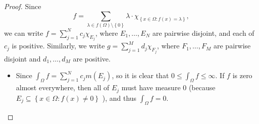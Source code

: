 \begin{proof}
    Since
    \[
        f = \sum_{\lambda \in f(\Omega) \setminus \left\{ 0 \right\} } \lambda 
    \cdot \chi _{\left\{ x \in \Omega: f(x) = \lambda \right\}  }, 
    \]
    we can write \(f = \sum_{j=1}^N c_j \chi _{E_j} \), where \(E_1, \dots , E_N\) are pairwise disjoint, and each of \(c_j\) is positive. Similarly, we write \(g = \sum_{j=1}^M d_j \chi _{F_j} \), where \(F_1, \dots , F_M\) are pairwise disjoint and \(d_1, \dots , d_M\) are positive.    
    \begin{itemize}
        \item [(a)] Since \(\int _\Omega f = \sum_{j=1}^N c_j m(E_j) \), so it is clear that \(0 \le \int _\Omega f \le \infty\). If \(f\) is zero almost everywhere, then all of \(E_j\) must have measure \(0\) (because \(E_j \subseteq \left\{ x \in \Omega : f(x) \neq 0 \right\} \) ), and thus \(\int _\Omega f = 0\). 
        

\end{itemize}
\end{proof}
